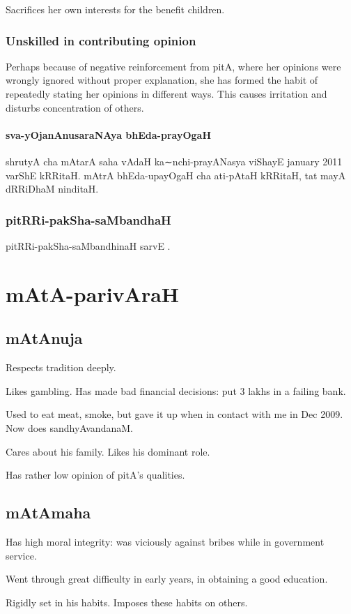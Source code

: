 \documentclass[oneside, article]{memoir}
\begin{document}
Sacrifices her own interests for the benefit children.

\section{Unskilled in contributing opinion}
Perhaps because of negative reinforcement from pitA, where her opinions were wrongly ignored without proper explanation, she has formed the habit of repeatedly stating her opinions in different ways. This causes irritation and disturbs concentration of others.

\subsection{sva-yOjanAnusaraNAya bhEda-prayOgaH}
shrutyA cha mAtarA saha vAdaH ka∼nchi-prayANasya viShayE january 2011 varShE kRRitaH. mAtrA bhEda-upayOgaH cha ati-pAtaH kRRitaH, tat mayA dRRiDhaM ninditaH.

\section{pitRRi-pakSha-saMbandhaH}
pitRRi-pakSha-saMbandhinaH sarvE .

\part{mAtA-parivAraH}
\chapter{mAtAnuja}
Respects tradition deeply.

Likes gambling. Has made bad financial decisions: put 3 lakhs in a failing bank.

Used to eat meat, smoke, but gave it up when in contact with me in Dec 2009. Now does sandhyAvandanaM.

Cares about his family. Likes his dominant role.

Has rather low opinion of pitA's qualities.

\chapter{mAtAmaha}
Has high moral integrity: was viciously against bribes while in government service.

Went through great difficulty in early years, in obtaining a good education.

Rigidly set in his habits. Imposes these habits on others.
\end{document}
